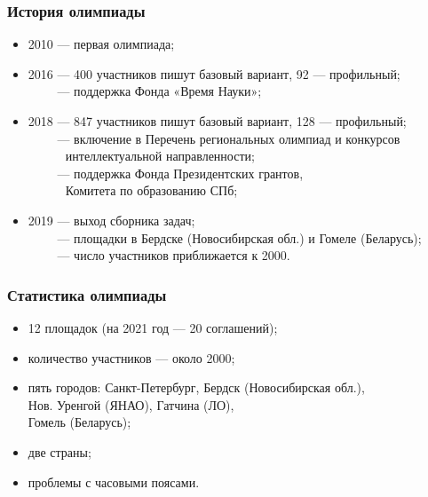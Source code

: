 % 

\begin{frame}\frametitle{История олимпиады}
\begin{itemize}
	\item 2010 — первая олимпиада;
	\item 2016 — 400 участников пишут базовый вариант, 92 --- профильный;\\
        $\phantom{2016}$ — поддержка Фонда «Время Науки»;
	\item 2018 — 847 участников пишут базовый вариант, 128 --- профильный;\\
        $\phantom{2018}$ — включение в Перечень региональных олимпиад и конкурсов\\
	$\phantom{2018 — }$\quad интеллектуальной направленности;\\
	$\phantom{2018}$ — поддержка Фонда Президентских грантов,\\
	$\phantom{2018 — }$\quad Комитета по образованию СПб;\\
	\item 2019 — выход сборника задач;\\
        $\phantom{2019}$ — площадки в Бердске (Новосибирская обл.) и Гомеле (Беларусь);\\
        $\phantom{2019}$ — число участников приближается к 2000.
\end{itemize}\end{frame}

\begin{frame}\frametitle{Статистика олимпиады}
\begin{itemize}
	\item 12 площадок (на 2021 год — 20 соглашений);\\
	\item количество участников --- около 2000;\\
	\item пять городов: Санкт-Петербург, Бердск (Новосибирская обл.), \\
		Нов. Уренгой (ЯНАО), Гатчина (ЛО), \\
		Гомель (Беларусь);\\
	\item две страны;\\
	\item проблемы с часовыми поясами.
\end{itemize}\end{frame}

